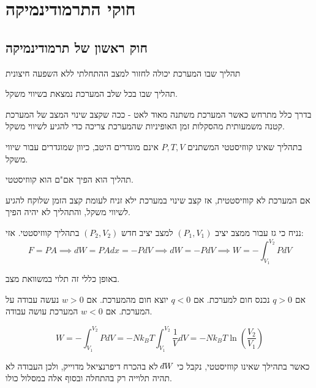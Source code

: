 \documentclass{tstextbook}
\begin{document}
\chapter{חוקי התרמודינמיקה}

\section{חוק ראשון של תרמודינמיקה}

\begin{definition}
תהליך שבו המערכת יכולה לחזור למצב ההתחלתי ללא השפעה חיצונית

\end{definition}
\begin{definition}
תהליך שבו בכל שלב המערכת נמצאת בשיווי משקל.

\end{definition}
בדרך כלל מתרחש כאשר המערכת משתנה מאוד לאט - ככה שקצב שינוי המצב של המערכת קטנה משמעותית מהסקלות זמן האופיניות שהמערכת צריכה כדי להגיע לשיווי משקל. 

\begin{remark}
בתהליך שאינו קווזיסטטי המשתנים \(P,T,V\) אינם מוגדרים היטב, כיוון שמוגדרים עבור שיווי משקל.

\end{remark}
\begin{proposition}
תהליך הוא הפיך אם"ם הוא קווזיסטטי.

\end{proposition}
אם המערכת לא קווזיסטטית, אז קצב שינוי במערכת ילא זניח לעומת קצב הזמן שלוקח להגיע לשיווי משקל, והתהליך לא יהיה הפיך.

\begin{proposition}[עבודה של גז]
נניח כי גז עבור ממצב יציב \((P_{1},V_{1})\) למצב יציב חדש \((P_{2},V_{2})\) בתהליך קווזיסטטי. אזי:
$$F=PA\implies dW = PAdx=-PdV\implies dW=-PdV\implies W=-\int_{V_{1}}^{V_{2}}PdV$$

\end{proposition}
\begin{remark}
באופן כללי זה תלוי במשוואת מצב.

\end{remark}
\begin{proposition}
אם \(q>0\) נכנס חום למערכת. 
אם \(q<0\) יוצא חום מהמערכת.
אם \(w>0\) נעשה עבודה על המערכת.
אם \(w<0\) המערכת עושה עבודה.

\end{proposition}
\begin{proposition}
$$W=-\int_{V_{1}}^{V_{2}}PdV=-Nk_{B}T\int_{V_{1}}^{V_{2}} \frac{1}{V}dV=-Nk_{B}T\ln\left( \frac{V_{2}}{V_{1}} \right)$$

\end{proposition}
כאשר בתהילך שאינו קווזיסטטי, נקבל כי \(\;\bar{}\mkern-7.5mu dW\)  לא בהכרח דיפרנציאל מדוייק, ולכן העבודה לא תהיה תלוייה רק בהתחלה ובסוף אלה במסלול כולו.
\end{document}
